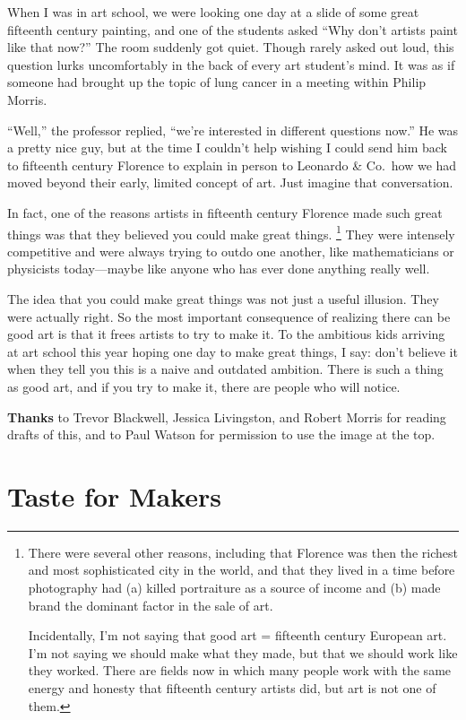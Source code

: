 \documentclass[12pt]{book}
\begin{document}
When I was in art school, we were looking one day at a slide of some
great fifteenth century painting, and one of the students asked ``Why
don't artists paint like that now?'' The room suddenly got quiet. Though
rarely asked out loud, this question lurks uncomfortably in the back of
every art student's mind. It was as if someone had brought up the topic
of lung cancer in a meeting within Philip Morris.

``Well,'' the professor replied, ``we're interested in different
questions now.'' He was a pretty nice guy, but at the time I couldn't
help wishing I could send him back to fifteenth century Florence to
explain in person to Leonardo \& Co.~how we had moved beyond their
early, limited concept of art. Just imagine that conversation.

In fact, one of the reasons artists in fifteenth century Florence made
such great things was that they believed you could make great things.
\footnote{There were several other reasons, including that Florence was
then the richest and most sophisticated city in the world, and that they
lived in a time before photography had (a) killed portraiture as a
source of income and (b) made brand the dominant factor in the sale of
art.

Incidentally, I'm not saying that good art = fifteenth century European
art. I'm not saying we should make what they made, but that we should
work like they worked. There are fields now in which many people work
with the same energy and honesty that fifteenth century artists did, but
art is not one of them.} They were intensely competitive and were
always trying to outdo one another, like mathematicians or physicists
today---maybe like anyone who has ever done anything really well.

The idea that you could make great things was not just a useful
illusion. They were actually right. So the most important consequence of
realizing there can be good art is that it frees artists to try to make
it. To the ambitious kids arriving at art school this year hoping one
day to make great things, I say: don't believe it when they tell you
this is a naive and outdated ambition. There is such a thing as good
art, and if you try to make it, there are people who will notice.


\textbf{Thanks} to Trevor Blackwell, Jessica Livingston, and Robert
Morris for reading drafts of this, and to Paul Watson for permission to
use the image at the top.
\chapter{Taste for Makers}
\end{document}
